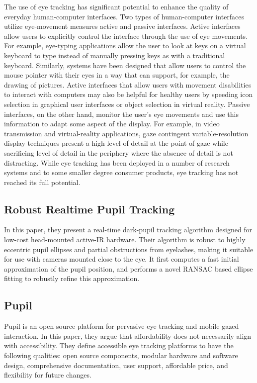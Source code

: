 \documentclass[12pt,fleqn]{book} %
\begin{document}
The use of eye tracking has significant potential to enhance the quality of everyday human-computer interfaces. Two types of human-computer interfaces utilize eye-movement measures active and passive interfaces. Active interfaces allow users to explicitly control the interface through the use of eye movements. For example, eye-typing applications allow the user to look at keys on a virtual keyboard to type instead of manually pressing keys as with a traditional keyboard. Similarly, systems have been designed that allow users to control the mouse pointer with their eyes in a way that can support, for example, the drawing of pictures. Active interfaces that allow users with movement disabilities to interact with computers may also be helpful for healthy users by speeding icon selection in graphical user interfaces or object selection in virtual reality. Passive interfaces, on the other hand, monitor the user's eye movements and use this information to adapt some aspect of the display. For example, in video transmission and virtual-reality applications, gaze contingent variable-resolution display techniques present a high level of detail at the point of gaze while sacrificing level of detail in the periphery where the absence of detail is not distracting. While eye tracking has been deployed in a number of research systems and to some smaller degree consumer products, eye tracking has not reached its full potential.

\subsection{Robust Realtime Pupil Tracking}
In this paper, they present a real-time dark-pupil tracking algorithm designed for low-cost head-mounted active-IR hardware. Their algorithm is robust to highly eccentric pupil ellipses and partial obstructions from eyelashes, making it suitable for use with cameras mounted close to the eye. It first computes a fast initial approximation of the pupil position, and performs a novel RANSAC based ellipse fitting to robustly refine this approximation.

\subsection{Pupil}
Pupil is an open source platform for pervasive eye tracking and mobile gazed interaction. In this paper, they argue that affordability does not necessarily align with accessibility. They define accessible eye tracking platforms to have the following qualities: open source components, modular hardware and software design, comprehensive documentation, user support, affordable price, and flexibility for future changes. \bigskip
\end{document}
